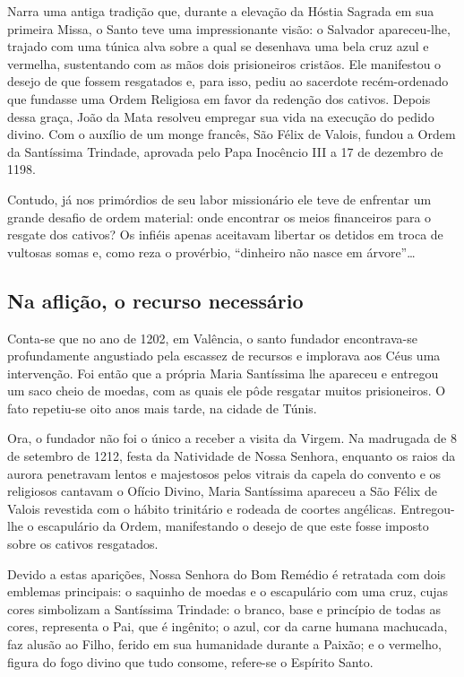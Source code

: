 \documentclass[a4paper,14pt]{extarticle} \usepackage[utf8]{inputenc}
\begin{document}
Narra uma antiga tradição que, durante a elevação da Hóstia Sagrada em sua primeira Missa, o Santo teve uma impressionante visão: o Salvador apareceu-lhe, trajado com uma túnica alva sobre a qual se desenhava uma bela cruz azul e vermelha, sustentando com as mãos dois prisioneiros cristãos. Ele manifestou o desejo de que fossem resgatados e, para isso, pediu ao sacerdote recém-ordenado que fundasse uma Ordem Religiosa em favor da redenção dos cativos. Depois dessa graça, João da Mata resolveu empregar sua vida na execução do pedido divino. Com o auxílio de um monge francês, São Félix de Valois, fundou a Ordem da Santíssima Trindade, aprovada pelo Papa Inocêncio III a 17 de dezembro de 1198.

Contudo, já nos primórdios de seu labor missionário ele teve de enfrentar um grande desafio de ordem material: onde encontrar os meios financeiros para o resgate dos cativos? Os infiéis apenas aceitavam libertar os detidos em troca de vultosas somas e, como reza o provérbio, “dinheiro não nasce em árvore”…

\subsection{Na aflição, o recurso necessário}

Conta-se que no ano de 1202, em Valência, o santo fundador encontrava-se profundamente angustiado pela escassez de recursos e implorava aos Céus uma intervenção. Foi então que a própria Maria Santíssima lhe apareceu e entregou um saco cheio de moedas, com as quais ele pôde resgatar muitos prisioneiros. O fato repetiu-se oito anos mais tarde, na cidade de Túnis.

Ora, o fundador não foi o único a receber a visita da Virgem. Na madrugada de 8 de setembro de 1212, festa da Natividade de Nossa Senhora, enquanto os raios da aurora penetravam lentos e majestosos pelos vitrais da capela do convento e os religiosos cantavam o Ofício Divino, Maria Santíssima apareceu a São Félix de Valois revestida com o hábito trinitário e rodeada de coortes angélicas. Entregou-lhe o escapulário da Ordem, manifestando o desejo de que este fosse imposto sobre os cativos resgatados.

Devido a estas aparições, Nossa Senhora do Bom Remédio é retratada com dois emblemas principais: o saquinho de moedas e o escapulário com uma cruz, cujas cores simbolizam a Santíssima Trindade: o branco, base e princípio de todas as cores, representa o Pai, que é ingênito; o azul, cor da carne humana machucada, faz alusão ao Filho, ferido em sua humanidade durante a Paixão; e o vermelho, figura do fogo divino que tudo consome, refere-se o Espírito Santo.
\end{document}
